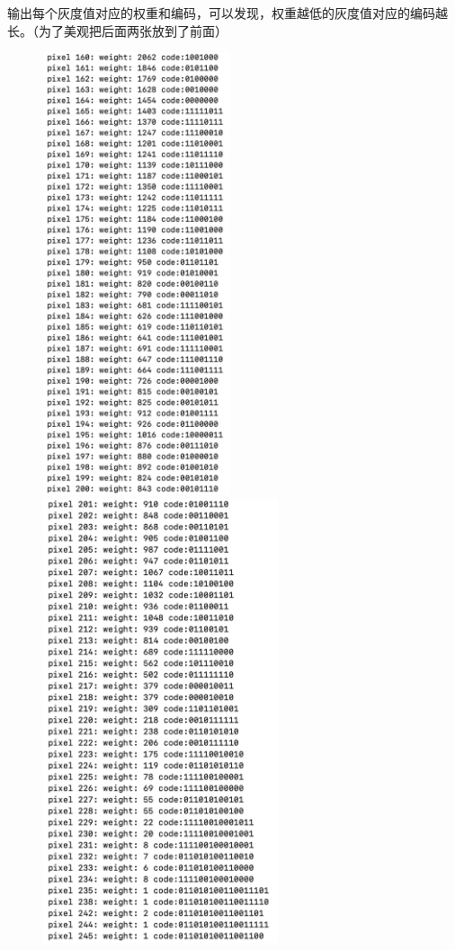 \begin{enumerate}
                \par 输出每个灰度值对应的权重和编码，可以发现，权重越低的灰度值对应的编码越长。（为了美观把后面两张放到了前面）
                \begin{figure}[htbp]
                    \centering
                    \includegraphics*[width = 5.5cm]{s3_8_2.png}
                    \includegraphics*[width = 6.9cm]{s3_8_3.png}

\end{figure}
\end{enumerate}
